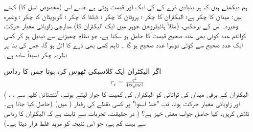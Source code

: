  ہم دیکھتے ہیں کہ ہر بنیادی ذرے کے  کی ایک  اور  قیمت ہوتی ہے جسے اس (مخصوص نسل کا)   کہتے ہیں:   میذان  کا چکر  ہے؛  الیکٹران کا چکر ؛  پروٹان کا چکر ؛  ڈیلٹا کا چکر ؛  گریویٹان کا چکر ؛  وغیرہ وغیرہ۔ اس کے برعکس، (مثلاً   ہائیڈروجن جوہر میں ایک الیکٹران کا) مدارچی زاویائی معیار حرکت کوانٹم عدد  کوئی بھی عدد صحیح قیمت  کا حامل ہو  سکتا ہے، جو نظام چھیڑنے سے تبدیل ہو کر کسی ایک  عدد  صحیح سے کوئی  دوسرا عدد صحیح  ہو گا ۔ تاہم کسی بھی ذرے کا  اٹل ہو گا،  جس کی بنا پر نظریہ چکر نسبتاً  سادہ ہے۔ 

اگر الیکٹران ایک کلاسیکی ٹھوس کرہ ہوتا جس کا رداس 
\begin{align}
r_c = \frac{e^2}{4 \pi \epsilon_0 m c ^2}
\end{align}
(  الیکٹران کے برقی میدان کی توانائی کو الیکٹران کی کمیت کا جواز لیتے ہوئے،  آئنشٹائن کلیہ   سے   ، ،   حاصل کیا جاتا ہے۔) اور    زاویائی معیار حرکت  ہوتا، تب "خط    استوا"    پر کسی 
نقطے کی رفتار (  میں)  تلاش کریں۔ کیا حاصل جواب معنی خیز ہے؟  ( در حقیقت،  تجربات سے ثابت  ہے کہ الیکٹران کا رداس  سے بہت کم ہے،  جو اس نتیجہ کو  مزید غلط قرار   دیتا ہے۔) 


